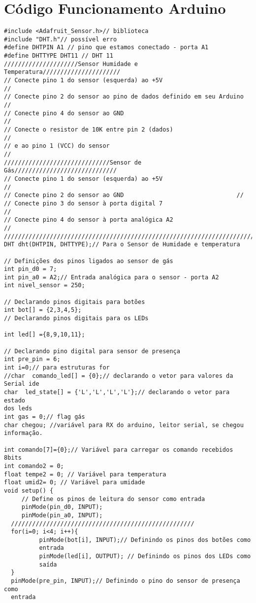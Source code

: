 \chapter{Código Funcionamento Arduino}

\begin{verbatim}
#include <Adafruit_Sensor.h>// biblioteca
#include "DHT.h"// possível erro
#define DHTPIN A1 // pino que estamos conectado - porta A1
#define DHTTYPE DHT11 // DHT 11
/////////////////////Sensor Humidade e Temperatura//////////////////////
// Conecte pino 1 do sensor (esquerda) ao +5V                         //
// Conecte pino 2 do sensor ao pino de dados definido em seu Arduino  //
// Conecte pino 4 do sensor ao GND                                    //
// Conecte o resistor de 10K entre pin 2 (dados)                      //
// e ao pino 1 (VCC) do sensor                                        //
//////////////////////////////Sensor de Gás/////////////////////////////
// Conecte pino 1 do sensor (esquerda) ao +5V                         //
// Conecte pino 2 do sensor ao GND                                //
// Conecte pino 3 do sensor à porta digital 7                         //
// Conecte pino 4 do sensor à porta analógica A2                      //
////////////////////////////////////////////////////////////////////////
DHT dht(DHTPIN, DHTTYPE);// Para o Sensor de Humidade e temperatura

// Definições dos pinos ligados ao sensor de gás
int pin_d0 = 7;
int pin_a0 = A2;// Entrada analógica para o sensor - porta A2
int nivel_sensor = 250;

// Declarando pinos digitais para botões
int bot[] = {2,3,4,5};
// Declarando pinos digitais para os LEDs

int led[] ={8,9,10,11};

// Declarando pino digital para sensor de presença
int pre_pin = 6;
int i=0;// para estruturas for
//char  comando_led[] = {0};// declarando o vetor para valores da
Serial ide
char  led_state[] = {'L','L','L','L'};// declarando o vetor para estado
dos leds
int gas = 0;// flag gás
char chegou; //variável para RX do arduino, leitor serial, se chegou
informação.

int comando[7]={0};// Variável para carregar os comando recebidos 8bits
int comando2 = 0;
float tempe2 = 0; // Variável para temperatura
float umid2= 0; // Variável para umidade
void setup() {
     // Define os pinos de leitura do sensor como entrada
     pinMode(pin_d0, INPUT);
     pinMode(pin_a0, INPUT);
  ////////////////////////////////////////////////////
  for(i=0; i<4; i++){
          pinMode(bot[i], INPUT);// Definindo os pinos dos botões como
          entrada
          pinMode(led[i], OUTPUT); // Definindo os pinos dos LEDs como
          saída
  }
  pinMode(pre_pin, INPUT);// Definindo o pino do sensor de presença como
  entrada


\end{verbatim}
